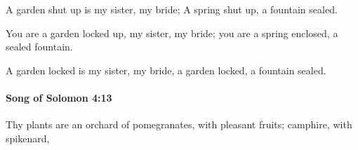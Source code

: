 			\begin{versebox}
					\item[BHS] 
					\item[LXX] 
					\item[ASV] A garden shut up is my sister, my bride; A spring shut up, a fountain sealed.
					\item[NIV] You are a garden locked up, my sister, my bride; you are a spring enclosed, a sealed fountain.
					\item[NRSV] A garden locked is my sister, my bride, a garden locked, a fountain sealed.
			\end{versebox}

		\paragraph{Song of Solomon 4:13} %
			\label{SONGOFSOLOMON-4-13}

			Thy plants are an orchard of pomegranates, with pleasant fruits; camphire, with spikenard,

